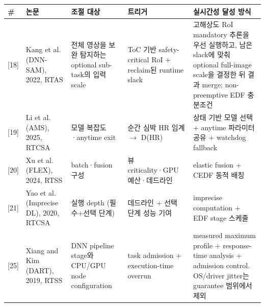 \documentclass[10pt]{article}
\begin{document}
\begin{center}\scriptsize
\begin{tabular}{@{}C{0.6cm}L{2.2cm}L{2.8cm}L{2.8cm}L{4.5cm}@{}}
\toprule
\# & 논문 & 조절 대상 & 트리거 & 실시간성 달성 방식 \\ \midrule
{[18]} & Kang et al. (DNN-SAM), 2022, RTAS & 전체 영상을 보완 탐지하는 optional sub-task의 입력 scale & ToC 기반 safety-critical RoI + reclaim된 runtime slack & 고해상도 RoI mandatory 추론을 우선 실행하고, 남은 slack에 맞춰 optional full-image scale을 결정한 뒤 결과 merge; non-preemptive EDF 충분조건 \\
{[19]} & Li et al. (AMS), 2025, RTCSA & 모델 복잡도·anytime exit & 순간 심박 HR 임계 $\rightarrow$ D(HR) & 상태 기반 모델 선택 + anytime 파라미터 공유 + watchdog fallback \\
{[20]} & Xu et al. (FLEX), 2024, RTSS & batch·fusion 구성 & 뷰 criticality·GPU 예산·데드라인 & elastic fusion + CEDF 동적 배칭 \\
{[21]} & Yao et al. (Imprecise DL), 2020, RTCSA & 실행 depth (필수+선택 단계) & 데드라인 + 선택 단계 성능 기여 & imprecise computation + EDF stage 스케줄 \\
{[25]} & Xiang and Kim (DART), 2019, RTSS & DNN pipeline stage와 CPU/GPU node configuration & task admission + execution-time overrun & measured maximum profile + response-time analysis + admission control. OS/driver jitter는 guarantee 범위에서 제외 \\
\bottomrule
\end{tabular}
\end{center}
\end{document}
